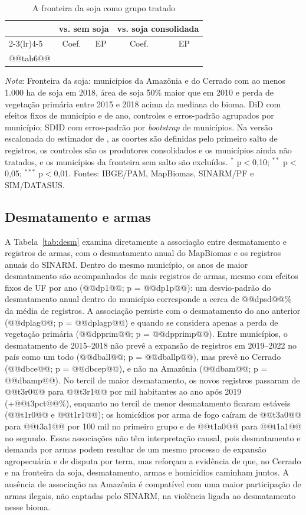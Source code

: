 \documentclass[11pt,a4paper]{article}
\newcommand{\nota}[1]{\par\vspace{2pt}\begin{minipage}{\linewidth}\footnotesize\textit{Nota}: #1\end{minipage}}
\begin{document}
\begin{table}[H]
\centering\footnotesize\setlength{\tabcolsep}{4pt}
\caption{A fronteira da soja como grupo tratado}\label{tab:soja}
\begin{tabular}{lcccc}
\toprule
 & \multicolumn{2}{c}{vs. sem soja} & \multicolumn{2}{c}{vs. soja consolidada} \\
\cmidrule(lr){2-3}\cmidrule(lr){4-5}
 & Coef. & EP & Coef. & EP \\
\midrule
@@tab6@@
\bottomrule
\end{tabular}
\nota{Fronteira da soja: municípios da Amazônia e do Cerrado com ao menos 1.000 ha de soja em 2018, área de soja 50\% maior que em 2010 e perda de vegetação primária entre 2015 e 2018 acima da mediana do bioma. DiD com efeitos fixos de município e de ano, controles e erros-padrão agrupados por município; SDID com erros-padrão por \textit{bootstrap} de municípios. Na versão escalonada do estimador de \citet{callaway2021}, as coortes são definidas pelo primeiro salto de registros, os controles são os produtores consolidados e os municípios ainda não tratados, e os municípios da fronteira sem salto são excluídos. $^{*}$ p$<$0,10; $^{**}$ p$<$0,05; $^{***}$ p$<$0,01. Fontes: IBGE/PAM, MapBiomas, SINARM/PF e SIM/DATASUS.}
\end{table}

\subsection*{Desmatamento e armas}

A Tabela~\ref{tab:desm} examina diretamente a associação entre desmatamento e registros de armas, com o desmatamento anual do MapBiomas e os registros anuais do SINARM. Dentro do mesmo município, os anos de maior desmatamento são acompanhados de mais registros de armas, mesmo com efeitos fixos de UF por ano (@@dp1@@; p = @@dp1p@@): um desvio-padrão do desmatamento anual dentro do município corresponde a cerca de @@dpsd@@\% da média de registros. A associação persiste com o desmatamento do ano anterior (@@dplag@@; p = @@dplagp@@) e quando se considera apenas a perda de vegetação primária (@@dpprim@@; p = @@dpprimp@@). Entre municípios, o desmatamento de 2015--2018 não prevê a expansão de registros em 2019--2022 no país como um todo (@@dball@@; p = @@dballp@@), mas prevê no Cerrado (@@dbce@@; p = @@dbcep@@), e não na Amazônia (@@dbam@@; p = @@dbamp@@). No tercil de maior desmatamento, os novos registros passaram de @@t3r0@@ para @@t3r1@@ por mil habitantes ao ano após 2019 (+@@t3pct@@\%), enquanto no tercil de menor desmatamento ficaram estáveis (@@t1r0@@ e @@t1r1@@); os homicídios por arma de fogo caíram de @@t3a0@@ para @@t3a1@@ por 100 mil no primeiro grupo e de @@t1a0@@ para @@t1a1@@ no segundo. Essas associações não têm interpretação causal, pois desmatamento e demanda por armas podem resultar de um mesmo processo de expansão agropecuária e de disputa por terra, mas reforçam a evidência de que, no Cerrado e na fronteira da soja, desmatamento, armas e homicídios caminham juntos. A ausência de associação na Amazônia é compatível com uma maior participação de armas ilegais, não captadas pelo SINARM, na violência ligada ao desmatamento nesse bioma.
\end{document}
